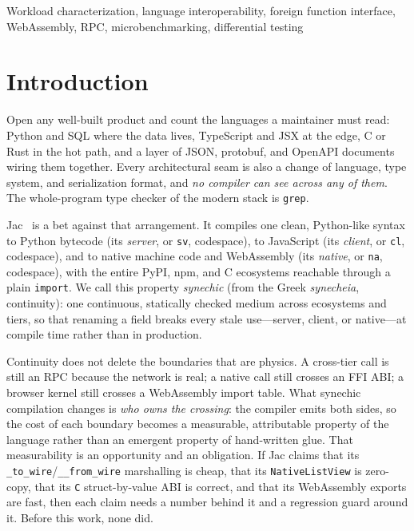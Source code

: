 \documentclass[conference]{IEEEtran}
\newcommand{\code}[1]{\texttt{#1}}
\begin{document}
\begin{IEEEkeywords}
Workload characterization, language interoperability, foreign function interface,
WebAssembly, RPC, microbenchmarking, differential testing
\end{IEEEkeywords}

\section{Introduction}

Open any well-built product and count the languages a maintainer must read:
Python and SQL where the data lives, TypeScript and JSX at the edge, C or Rust in
the hot path, and a layer of JSON, protobuf, and OpenAPI documents wiring them
together. Every architectural seam is also a change of language, type system, and
serialization format, and \emph{no compiler can see across any of them}. The
whole-program type checker of the modern stack is \code{grep}.

Jac~\cite{jac} is a bet against that arrangement. It compiles one clean,
Python-like syntax to Python bytecode (its \emph{server}, or \code{sv},
codespace), to JavaScript (its \emph{client}, or \code{cl}, codespace), and to
native machine code and WebAssembly (its \emph{native}, or \code{na}, codespace),
with the entire PyPI, npm, and C ecosystems reachable through a plain
\code{import}. We call this property \emph{synechic} (from the Greek
\emph{synecheia}, continuity): one continuous, statically checked medium across
ecosystems and tiers, so that renaming a field breaks every stale use---server,
client, or native---at compile time rather than in production.

Continuity does not delete the boundaries that are physics. A cross-tier call is
still an RPC because the network is real; a native call still crosses an FFI ABI;
a browser kernel still crosses a WebAssembly import table. What synechic
compilation changes is \emph{who owns the crossing}: the compiler emits both
sides, so the cost of each boundary becomes a measurable, attributable property
of the language rather than an emergent property of hand-written glue. That
measurability is an opportunity and an obligation. If Jac claims that its
\code{\_to\_wire}/\code{\_\_from\_wire} marshalling is cheap, that its
\code{NativeListView} is zero-copy, that its \code{C} struct-by-value ABI is
correct, and that its WebAssembly exports are fast, then each claim needs a
number behind it and a regression guard around it. Before this work, none did.
\end{document}
